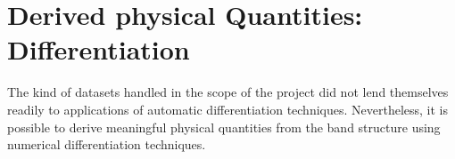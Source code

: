 




\section{Derived physical Quantities: Differentiation}
\label{sec:deriv-phys-quant}



The kind of datasets handled in the scope of the project did not lend themselves
readily to applications of automatic differentiation techniques. Nevertheless,
it is possible to derive meaningful physical quantities from the band structure
using numerical differentiation techniques.

